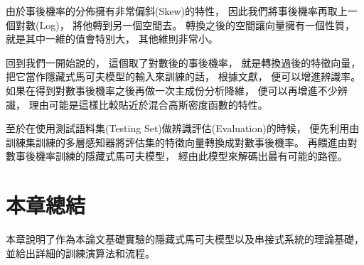   由於事後機率的分佈擁有非常偏斜(Skew)的特性，
  因此我們將事後機率再取上一個對數(Log)，
  將他轉到另一個空間去。
  轉換之後的空間讓向量擁有一個性質，
  就是其中一維的值會特別大，
  其他維則非常小。

  回到我們一開始說的，
  這個取了對數後的事後機率，
  就是轉換過後的特徵向量，
  把它當作隱藏式馬可夫模型的輸入來訓練的話，
  根據文獻\cite{HermanskyTandem}，
  便可以增進辨識率。
  如果在得到對數事後機率之後再做一次主成份分析降維，
  便可以再增進不少辨識，
  理由可能是這樣比較貼近於混合高斯密度函數的特性。

  至於在使用測試語料集(Testing Set)做辨識評估(Evaluation)的時候，
  便先利用由訓練集訓練的多層感知器將評估集的特徵向量轉換成對數事後機率。
  再餵進由對數事後機率訓練的隱藏式馬可夫模型，
  經由此模型來解碼出最有可能的路徑。

\section{本章總結}
  本章說明了作為本論文基礎實驗的隱藏式馬可夫模型以及串接式系統的理論基礎，
  並給出詳細的訓練演算法和流程。

